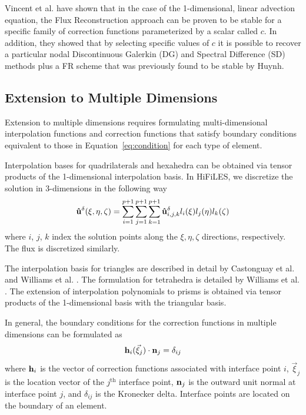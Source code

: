 Vincent et al. \cite{vincent2011new} have shown that in the case of the 1-dimensional, linear advection equation, the Flux Reconstruction approach can be proven to be stable for a specific family of correction functions parameterized by a scalar called $c$. In addition, they showed that by selecting specific values of $c$ it is possible to recover a particular nodal Discontinuous Galerkin (DG) and Spectral Difference (SD) methods plus a FR scheme that was previously found to be stable by Huynh\cite{huynh2007flux}.

\subsection{Extension to Multiple Dimensions}

Extension to multiple dimensions requires formulating multi-dimensional interpolation functions and correction functions that satisfy boundary conditions equivalent to those in Equation~\eqref{eq:condition} for each type of element.

Interpolation bases for quadrilaterals and hexahedra can be obtained via tensor products of the 1-dimensional interpolation basis. In HiFiLES, we discretize the solution in 3-dimensions in the following way
\begin{equation}
{\bf \hat{u}}^\delta(\xi,\eta,\zeta) = \sum_{i=1}^{p+1} \sum_{j=1}^{p+1} \sum_{k=1}^{p+1}
{\bf \hat{u}}^\delta_{i,j,k} l_i(\xi) l_j(\eta) l_k(\zeta)
\end{equation}
where $i$, $j$, $k$ index the solution points along the $\xi, \eta, \zeta$ directions, respectively. The flux is discretized similarly.

The interpolation basis for triangles are described in detail by Castonguay et al. \cite{castonguay2012new} and Williams et al. \cite{williams2013tri}. The formulation for tetrahedra is detailed by Williams et al. \cite{williams2013tet}. The extension of interpolation polynomials to prisms is obtained via tensor products of the 1-dimensional basis with the triangular basis\cite{castonguay2011}. 

In general, the boundary conditions for the correction functions in multiple dimensions can be formulated as
\begin{equation}\label{eq:genConstraint}
{\bf h}_i( \vec{\xi}_j)\cdot {\bf n}_j = \delta_{ij}
\end{equation}
where ${\bf h}_i$ is the vector of correction functions associated with interface point $i$, $\vec{\xi}_j$ is the location vector of the $j^\text{th}$ interface point, ${\bf n}_j$ is the outward unit normal at interface point $j$, and $\delta_{ij}$ is the Kronecker delta. Interface points are located on the boundary of an element.

